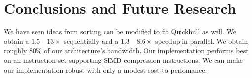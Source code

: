 \section{Conclusions and Future Research}

We have seen ideas from sorting can be modified to fit Quickhull as well.
We obtain a $1.5$~\textendash~$13\times$ sequentially and a 
$1.3$~\textendash~$8.6\times$ speedup in parallel. We obtain roughly $80\%$
of our architecture's bandwidth. Our implementation performs
best on an instruction set supporting SIMD compression instructions.
We can make our implementation robust with only a modest cost to perfomance.
